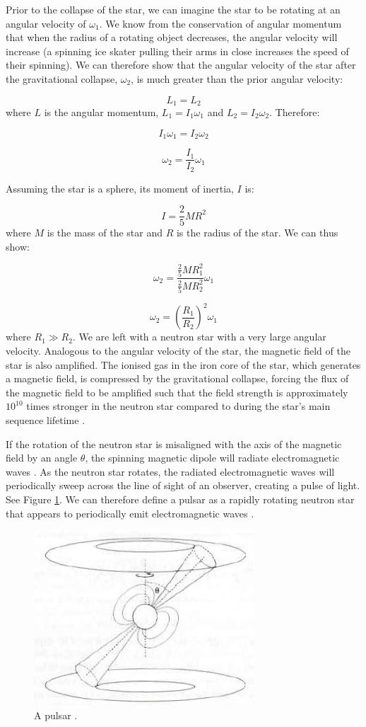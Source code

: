 \documentclass{article}
\begin{document}
Prior to the collapse of the star, we can imagine the star to be rotating at an angular velocity of $\omega_1$. We know from the conservation of angular momentum that when the radius of a rotating object decreases, the angular velocity will increase (a spinning ice skater pulling their arms in close increases the speed of their spinning). We can therefore show that the angular velocity of the star after the gravitational collapse, $\omega_2$, is much greater than the prior angular velocity:

$$L_1 = L_2$$ where $L$ is the angular momentum, $L_1=I_1\omega_1$ and $L_2=I_2\omega_2$. Therefore:

$$ I_1 \omega_1 = I_2 \omega_2 $$

$$\omega_2 = \frac{I_1}{I_2}\omega_1$$

Assuming the star is a sphere, its moment of inertia, $I$ is:

$$I = \frac{2}{5}MR^2$$ where $M$ is the mass of the star and $R$ is the radius of the star. We can thus show:

$$\omega_2 = \frac{\frac{2}{5}MR_1^2}{\frac{2}{5}MR_2^2}\omega_1$$

$$\omega_2 = \left(\frac{R_1}{R_2}\right)^2\omega_1$$ where $R_1 \gg R_2$. We are left with a neutron star with a very large angular velocity. Analogous to the angular velocity of the star, the magnetic field of the star is also amplified. The ionised gas in the iron core of the star, which generates a magnetic field, is compressed by the gravitational collapse, forcing the flux of the magnetic field to be amplified such that the field strength is approximately $10^{10}$ times stronger in the neutron star compared to during the star's main sequence lifetime \autocite{maoz}.

If the rotation of the neutron star is misaligned with the axis of the magnetic field by an angle $\theta$, the spinning magnetic dipole will radiate electromagnetic waves \autocite{maoz}. As the neutron star rotates, the radiated electromagnetic waves will periodically sweep across the line of sight of an observer, creating a pulse of light. See Figure \ref{fig:pulsar1}. We can therefore define a pulsar as a rapidly rotating neutron star that appears to periodically emit electromagnetic waves \autocite{maoz,lorimer,swainston}.

\begin{figure}[h!]
    \centering
    \includegraphics{pulsar.jpg}
    \caption{A pulsar \autocite{maoz}.}
    \label{fig:pulsar1}
\end{figure}
\end{document}
